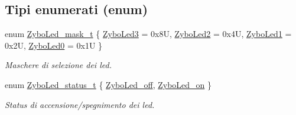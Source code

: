 \subsection*{Tipi enumerati (enum)}
\begin{DoxyCompactItemize}
\item 
enum \hyperlink{group___led_gad11701cccac394f7e1f90de8f85695f3}{Zybo\+Led\+\_\+mask\+\_\+t} \{ \hyperlink{group___led_ggad11701cccac394f7e1f90de8f85695f3adc5edc2adfd899da9f149cb61364b141}{Zybo\+Led3} = 0x8U, 
\hyperlink{group___led_ggad11701cccac394f7e1f90de8f85695f3a4fa521f6fce7c4ba77d1d8144e71cdfc}{Zybo\+Led2} = 0x4U, 
\hyperlink{group___led_ggad11701cccac394f7e1f90de8f85695f3ad71c06f65dfffcf825d48f287718d9be}{Zybo\+Led1} = 0x2U, 
\hyperlink{group___led_ggad11701cccac394f7e1f90de8f85695f3ae1a1e8fa0bf803793ff27004884b85fe}{Zybo\+Led0} = 0x1U
 \}\begin{DoxyCompactList}\small\item\em Maschere di selezione dei led. \end{DoxyCompactList}
\item 
enum \hyperlink{group___led_ga3dcb274f22e577705c49944b8d1f4b12}{Zybo\+Led\+\_\+status\+\_\+t} \{ \hyperlink{group___led_gga3dcb274f22e577705c49944b8d1f4b12a9679f1c302afdb51915a2331b4ec92f3}{Zybo\+Led\+\_\+off}, 
\hyperlink{group___led_gga3dcb274f22e577705c49944b8d1f4b12aafcf0ae16a6edec807c06bb0a99f7e8b}{Zybo\+Led\+\_\+on}
 \}\begin{DoxyCompactList}\small\item\em Status di accensione/spegnimento dei led. \end{DoxyCompactList}
\end{DoxyCompactItemize}
